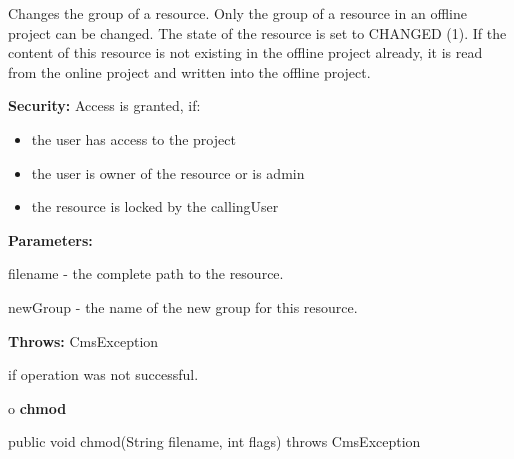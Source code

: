 \begin{description}
\htmlDD Changes the group of a resource. \htmlBR
Only the group of a resource in an offline project can be changed. The state
of the resource is set to CHANGED (1). If the content of this resource is not
existing in the offline project already, it is read from the online project
and written into the offline project. 

{\bf Security:} Access is granted, if: 

\begin{itemize}
\item the user has access to the project 
\item the user is owner of the resource or is admin 
\item the resource is locked by the callingUser 
\end{itemize}

\begin{description}
\item {\bf Parameters:}  

filename - the complete path to the resource.  

newGroup - the name of the new group for this resource.  
\item {\bf Throws:} CmsException  

if operation was not successful.  
\end{description}

\end{description}

o {\bf chmod} 

\begin{PRE}
 public void chmod(String filename,
                   int flags) throws CmsException
\end{PRE}

